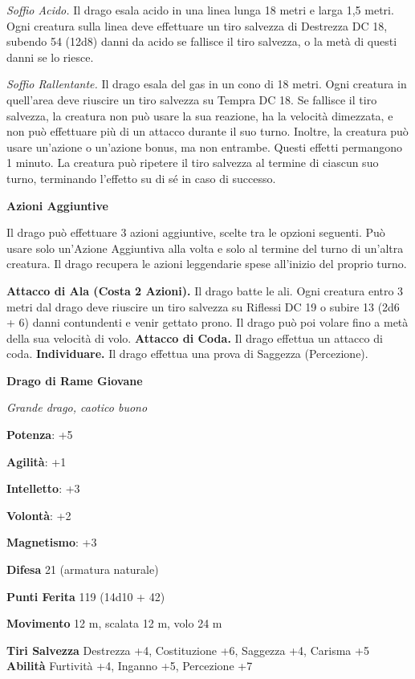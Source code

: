 \begin{multicols}{2}
\emph{Soffio Acido.} Il drago esala acido in una linea lunga 18 metri e
larga 1,5 metri. Ogni creatura sulla linea deve effettuare un tiro
salvezza di Destrezza DC 18, subendo 54 (12d8) danni da acido se
fallisce il tiro salvezza, o la metà di questi danni se lo riesce.

\emph{Soffio Rallentante.} Il drago esala del gas in un cono di 18
metri. Ogni creatura in quell'area deve riuscire un tiro salvezza su Tempra DC 18. Se fallisce il tiro salvezza, la creatura non può
usare la sua reazione, ha la velocità dimezzata, e non può effettuare
più di un attacco durante il suo turno. Inoltre, la creatura può usare
un'azione o un'azione bonus, ma non entrambe. Questi effetti permangono
1 minuto. La creatura può ripetere il tiro salvezza al termine di
ciascun suo turno, terminando l'effetto su di sé in caso di successo.

\textbf{Azioni Aggiuntive}

Il drago può effettuare 3 azioni aggiuntive, scelte tra le opzioni
seguenti. Può usare solo un'Azione Aggiuntiva alla volta e solo al
termine del turno di un'altra creatura. Il drago recupera le azioni
leggendarie spese all'inizio del proprio turno.

\textbf{Attacco di Ala (Costa 2 Azioni).} Il drago batte le ali. Ogni
creatura entro 3 metri dal drago deve riuscire un tiro salvezza su Riflessi DC 19 o subire 13 (2d6 + 6) danni contundenti e venir gettato
prono. Il drago può poi volare fino a metà della sua velocità di volo.
\textbf{Attacco di Coda.} Il drago effettua un attacco di coda.
\textbf{Individuare.} Il drago effettua una prova di Saggezza
(Percezione).

\textbf{Drago di Rame Giovane}

\emph{Grande drago, caotico buono}

\textbf{Potenza}: +5

\textbf{Agilità}: +1

\textbf{Intelletto}: +3

\textbf{Volontà}: +2

\textbf{Magnetismo}: +3

\textbf{Difesa} 21 (armatura naturale)

\textbf{Punti Ferita} 119 (14d10 + 42)

\textbf{Movimento} 12 m, scalata 12 m, volo 24 m

\textbf{Tiri Salvezza} Destrezza +4, Costituzione +6, Saggezza +4,
Carisma +5 \textbf{Abilità} Furtività +4, Inganno +5, Percezione +7


\end{multicols}
